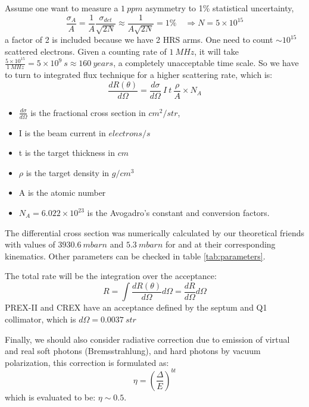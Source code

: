 Assume one want to measure a $1 \ ppm$ asymmetry to 1\% statistical uncertainty,
\begin{equation}
    \frac{\sigma_A}{A} = \frac{1}{A}\frac{\sigma_{det}}{\sqrt{2N}} 
    \approx \frac{1}{A\sqrt{2N}} = 1\% \quad 
    \Longrightarrow N = 5 \times 10^{15} 
    \label{eqn:statistical_error}
\end{equation}
a factor of 2 is included because we have 2 HRS arms.
One need to count $\sim10^{15}$ scattered electrons. Given a counting rate of $1\ MHz$, 
it will take $\frac{5\times 10^{15}}{1\ MHz} = 5\times 10^{9}\ s \approx 160 \ years$,
a completely unacceptable time scale. So we have to turn to integrated flux technique
for a higher scattering rate, which is:
\begin{equation}
    \frac{dR(\theta)}{d\Omega} = \frac{d\sigma}{d\Omega}\ I\ t\ \frac{\rho}{A} \times N_A   
\end{equation}
\begin{itemize}
    \item $\frac{d\sigma}{d\Omega}$ is the fractional cross section in $cm^2/str$,
    \item I is the beam current in $electrons/s$
    \item t is the target thickness in $cm$
    \item $\rho$ is the target density in $g/cm^{3}$
    \item A is the atomic number
    \item $N_A = 6.022\times 10^{23}$ is the Avogadro's constant and conversion factors.
\end{itemize}

The differential cross section was numerically calculated by our theoretical friends
with values of $3930.6 \ mbarn$ and $5.3 \ mbarn$ for \Pb and \Ca at their corresponding
kinematics. Other parameters can be checked in table \ref{tab:parameters}.

The total rate will be the integration over the acceptance:
\begin{equation}
    R = \int \frac{dR(\theta)}{d\Omega} d\Omega = \frac{dR}{d\Omega} d\Omega
\end{equation}
PREX-II and CREX have an acceptance defined by the septum and Q1 collimator, which
is $d\Omega = 0.0037 \ str$

Finally, we should also consider radiative correction due to emission of virtual
and real soft photons (Bremsstrahlung), and hard photons by vacuum polarization,
this correction is formulated as:
\begin{equation}
    \eta = \left(\frac{\Delta}{E} \right)^{bt}
\end{equation}
which is evaluated to be: $\eta \sim 0.5$.

